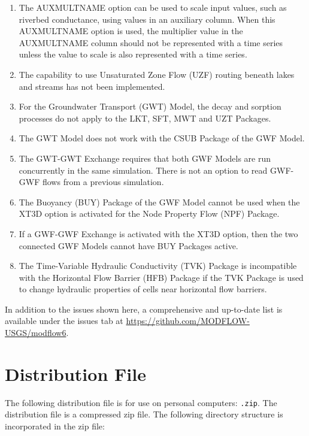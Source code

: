 \documentclass[11pt,twoside,twocolumn]{usgsreport}
\begin{document}
\begin{enumerate}

\item
The AUXMULTNAME option can be used to scale input values, such as riverbed conductance, using values in an auxiliary column.  When this AUXMULTNAME option is used, the multiplier value in the AUXMULTNAME column should not be represented with a time series unless the value to scale is also represented with a time series.  

\item
The capability to use Unsaturated Zone Flow (UZF) routing beneath lakes and streams has not been implemented.

\item
For the Groundwater Transport (GWT) Model, the decay and sorption processes do not apply to the LKT, SFT, MWT and UZT Packages.

\item
The GWT Model does not work with the CSUB Package of the GWF Model.  

\item
The GWT-GWT Exchange requires that both GWF Models are run concurrently in the same simulation.  There is not an option to read GWF-GWF flows from a previous simulation.

\item
The Buoyancy (BUY) Package of the GWF Model cannot be used when the XT3D option is activated for the Node Property Flow (NPF) Package.

\item
If a GWF-GWF Exchange is activated with the XT3D option, then the two connected GWF Models cannot have BUY Packages active.

\item
The Time-Variable Hydraulic Conductivity (TVK) Package is incompatible with the Horizontal Flow Barrier (HFB) Package if the TVK Package is used to change hydraulic properties of cells near horizontal flow barriers.

\end{enumerate}

In addition to the issues shown here, a comprehensive and up-to-date list is available under the issues tab at \url{https://github.com/MODFLOW-USGS/modflow6}.


\section{Distribution File}
The following distribution file is for use on personal computers: \texttt{\modflowversion.zip}.  The distribution file is a compressed zip file. The following directory structure is incorporated in the zip file:
\end{document}
